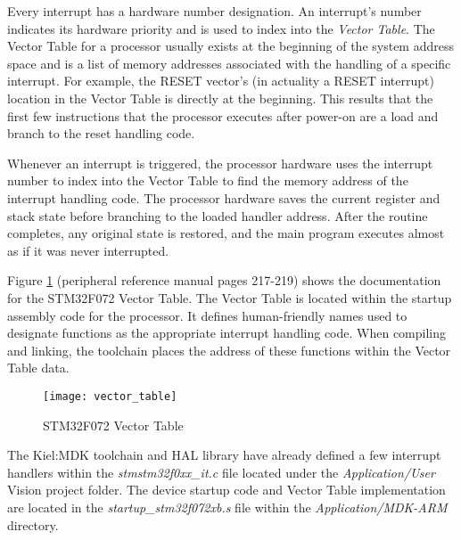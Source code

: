 \documentclass[11pt,fleqn]{book} %
\begin{document}
Every interrupt has a hardware number designation. An interrupt's number indicates its hardware priority and is used to index into the \textit{Vector Table}. The Vector Table for a processor usually exists at the beginning of the system address space and is a list of memory addresses associated with the handling of a specific interrupt. For example, the RESET vector's (in actuality a RESET interrupt) location in the Vector Table is directly at the beginning. This results that the first few instructions that the processor executes after power-on are a load and branch to the reset handling code. 

Whenever an interrupt is triggered, the processor hardware uses the interrupt number to index into the Vector Table to find the memory address of the interrupt handling code. The processor hardware saves the current register and stack state before branching to the loaded handler address. After the routine completes, any original state is restored, and the main program executes almost as if it was never interrupted. 

Figure \ref{vector_table} (peripheral reference manual pages 217-219) shows the documentation for the STM32F072 Vector Table. The Vector Table is located within the startup assembly code for the processor. It defines human-friendly names used to designate functions as the appropriate interrupt handling code. When compiling and linking, the toolchain places the address of these functions within the Vector Table data.  

\begin{figure}[]
    \centering\texttt{[image: vector\_table]}
    \caption{STM32F072 Vector Table}
    \label{vector_table}
\end{figure}


The Kiel:MDK toolchain and HAL library have already defined a few interrupt handlers within the \textit{stmstm32f0xx\_it.c} file located under the \textit{Application/User} {\textmu}Vision project folder. The device startup code and Vector Table implementation are located in the \textit{startup\_stm32f072xb.s} file within the \textit{Application/MDK-ARM} directory. 

\end{document}
